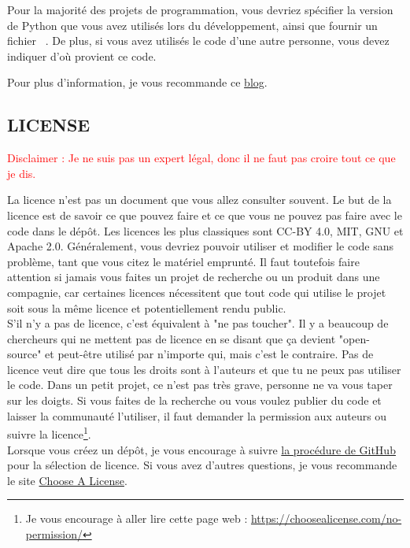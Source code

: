 \documentclass{book}
\newcommand{\code}[1]{\mbox{%
    \ttfamily
    \tcbox[
        on line,
        boxsep=0pt, left=4pt, right=4pt, top=2pt, bottom=1.5pt,
        toprule=0pt, rightrule=0pt, bottomrule=0pt, leftrule=0pt,
        oversize=0pt, enlarge left by=0pt, enlarge right by=0pt,
        colframe=white, colback=black!12,
        height=.8\baselineskip %
    ]{#1}%
}}
\begin{document}
Pour la majorité des projets de programmation, vous devriez spécifier la version de Python que vous avez utilisés lors du développement, ainsi que fournir un fichier \code{requirements.txt}. De plus, si vous avez utilisés le code d'une autre personne, vous devez indiquer d'où provient ce code.

Pour plus d'information, je vous recommande ce \href{https://www.freecodecamp.org/news/how-to-write-a-good-readme-file/}{blog}.
\subsection{LICENSE}

\textcolor{red}{Disclaimer : Je ne suis pas un expert légal, donc il ne faut pas croire tout ce que je dis.\\}

La licence n'est pas un document que vous allez consulter souvent. Le but de la licence est de savoir ce que pouvez faire et ce que vous ne pouvez pas faire avec le code dans le dépôt. Les licences les plus classiques sont CC-BY 4.0, MIT, GNU et Apache 2.0. Généralement, vous devriez pouvoir utiliser et modifier le code sans problème, tant que vous citez le matériel emprunté. Il faut toutefois faire attention si jamais vous faites un projet de recherche ou un produit dans une compagnie, car certaines licences nécessitent que tout code qui utilise le projet soit sous la même licence et potentiellement rendu public. \\

S'il n'y a pas de licence, c'est équivalent à "ne pas toucher". Il y a beaucoup de chercheurs qui ne mettent pas de licence en se disant que ça devient "open-source" et peut-être utilisé par n'importe qui, mais c'est le contraire. Pas de licence veut dire que tous les droits sont à l'auteurs et que tu ne peux pas utiliser le code. Dans un petit projet, ce n'est pas très grave, personne ne va vous taper sur les doigts. Si vous faites de la recherche ou vous voulez publier du code et laisser la communauté l'utiliser, il faut demander la permission aux auteurs ou suivre la licence\footnote{Je vous encourage à aller lire cette page web : \url{https://choosealicense.com/no-permission/}}. \\

Lorsque vous créez un dépôt, je vous encourage à suivre \href{https://docs.github.com/fr/repositories/managing-your-repositorys-settings-and-features/customizing-your-repository/licensing-a-repository}{la procédure de GitHub} pour la sélection de licence. Si vous avez d'autres questions, je vous recommande le site \href{https://choosealicense.com/}{Choose A License}.
\end{document}
